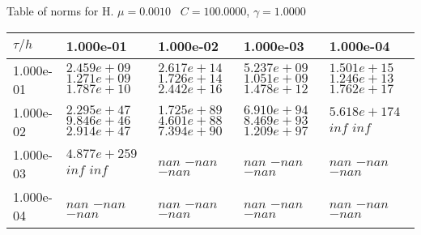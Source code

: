 \begin{center}
Table of norms for H. $\mu = 0.0010$ \, $C = 100.0000$, $\gamma = 1.0000$
  
\begin{tabular}{|p{1in}|p{1in}|p{1in}|p{1in}|p{1in}|} \hline
$\tau / h$ &1.000e-01 &1.000e-02 &1.000e-03 &1.000e-04 \\ \hline 
1.000e-01 & $2.459e+09$  $1.271e+09$  $1.787e+10$  & $2.617e+14$  $1.726e+14$  $2.442e+16$  & $5.237e+09$  $1.051e+09$  $1.478e+12$  & $1.501e+15$  $1.246e+13$  $1.762e+17$  \\ \hline 
1.000e-02 & $2.295e+47$  $9.846e+46$  $2.914e+47$  & $1.725e+89$  $4.601e+88$  $7.394e+90$  & $6.910e+94$  $8.469e+93$  $1.209e+97$  & $5.618e+174$  $inf$  $inf$  \\ \hline 
1.000e-03 & $4.877e+259$  $inf$  $inf$  & $nan$  $-nan$  $-nan$  & $nan$  $-nan$  $-nan$  & $nan$  $-nan$  $-nan$  \\ \hline 
1.000e-04 & $nan$  $-nan$  $-nan$  & $nan$  $-nan$  $-nan$  & $nan$  $-nan$  $-nan$  & $nan$  $-nan$  $-nan$  \\ \hline 

\end{tabular}\\[20pt]
\end{center}
